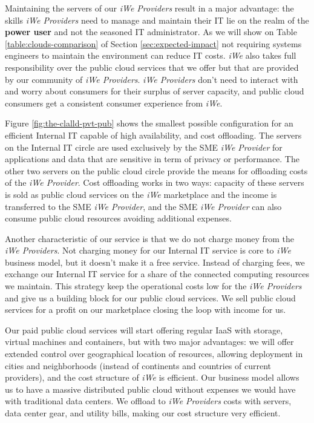 Maintaining the servers of our \textit{iWe Providers} result in a major
advantage: the skills \textit{iWe Providers} need to manage and maintain
their IT lie on the realm of the \textbf{power user} and not the seasoned IT
administrator. As we will show on Table \ref{table:clouds-comparison} of Section
\ref{sec:expected-impact} not requiring systems engineers to maintain the
environment can reduce IT costs.  \textit{iWe} also takes full responsibility
over the public cloud services that we offer but that are provided by our
community of \textit{iWe Providers}. \textit{iWe Providers} don't need to
interact with and worry about consumers for their surplus of server capacity,
and public cloud consumers get a consistent consumer experience from
\textit{iWe}.

Figure \ref{fig:the-clalld-pvt-pub} shows the smallest possible configuration
for an efficient Internal IT capable of high availability, and cost offloading.
The servers on the Internal IT circle are used exclusively by the SME
\textit{iWe Provider} for applications and data that are sensitive in term of
privacy or performance. The other two servers on the public cloud circle provide
the means for offloading costs of the \textit{iWe Provider}. Cost offloading
works in two ways: capacity of these servers is sold as public cloud services on
the \textit{iWe} marketplace and the income is transferred to the SME
\textit{iWe Provider}, and the SME \textit{iWe Provider} can also consume
public cloud resources avoiding additional expenses.

Another characteristic of our service is that we do not charge money from the
\textit{iWe Providers}. Not charging money for our Internal IT service is
core to \textit{iWe} business model, but it doesn't make it a free service.
Instead of charging fees, we exchange our Internal IT service for a share of the
connected computing resources we maintain. This strategy keep the operational
costs low for the \textit{iWe Providers} and give us a building block for our
public cloud services. We sell public cloud services for a profit on our
marketplace closing the loop with income for us.

Our paid public cloud services will start offering regular IaaS with storage,
virtual machines and containers, but with two major advantages: we will offer
extended control over geographical location of resources, allowing deployment in
cities and neighborhoods (instead of continents and countries of current
providers), and the cost structure of \textit{iWe} is efficient. Our business
model allows us to have a massive distributed public cloud without expenses we
would have with traditional data centers. We offload to \textit{iWe
Providers} costs with servers, data center gear, and utility bills, making our
cost structure very efficient.


